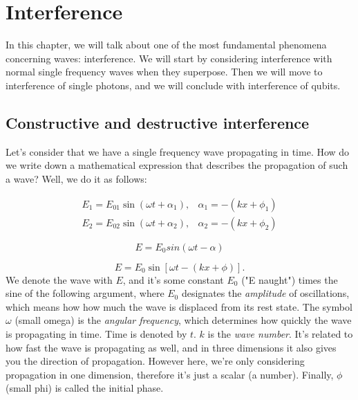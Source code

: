 \chapter{Interference}

In this chapter, we will talk about one of the most fundamental phenomena concerning waves: interference. We will start by considering interference with normal single frequency waves when they superpose. Then we will move to interference of single photons, and we will conclude with interference of qubits.

\section{Constructive and destructive interference}



Let's consider that we have a single frequency wave propagating in time. How do we write down a mathematical expression that describes the propagation of such a wave? Well, we do it as follows:

\begin{equation}
\begin{array}{ll}
E_{1}=E_{01} \sin \left(\omega t+\alpha_{1}\right), & \alpha_{1}=-\left(k x+\phi_{1}\right) \\
E_{2}=E_{02} \sin \left(\omega t+\alpha_{2}\right), & \alpha_{2}=-\left(k x+\phi_{2}\right)
\end{array}
\end{equation}


\begin{equation}
E = E_0 sin(\omega t - \alpha)
\end{equation}
\fi

\begin{equation}
E=E_0 \sin [\omega t-(k x+\phi)].
\end{equation}
We denote the wave with $E$, and it's some constant $E_0$ ("E naught") times the sine of the following argument, where $E_0$ designates the \emph{amplitude} of oscillations, which means how how much the wave is displaced from its rest state. The symbol $\omega$ (small omega) is the \emph{angular frequency}, which determines how quickly the wave is propagating in time. Time is denoted by $t$. $k$ is the \emph{wave number}. It's related to how fast the wave is propagating as well, and in three dimensions it also gives you the direction of propagation. However here, we're only considering propagation in one dimension, therefore it's just a scalar (a number). Finally, $\phi$ (small phi) is called the initial phase.

